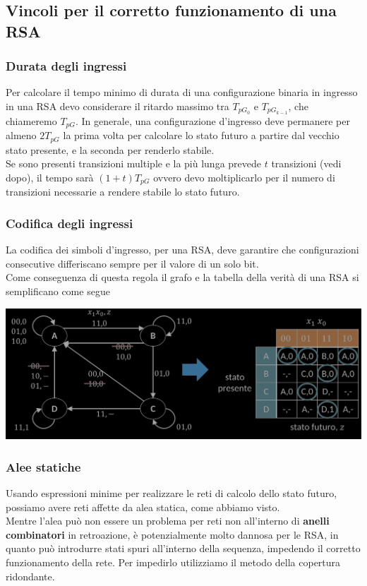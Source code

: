 \documentclass{article}
\begin{document}
\subsection{Vincoli per il corretto funzionamento di una RSA}
\subsubsection{Durata degli ingressi}
Per calcolare il tempo minimo di durata di una configurazione binaria in ingresso in una RSA devo considerare il ritardo massimo tra $T_{pG_0}$ e $T_{pG_{k-1}}$, che chiameremo $T_{pG}$. In generale, una configurazione d’ingresso deve permanere per almeno $2T_{pG}$ la prima volta per calcolare lo stato futuro a partire dal vecchio stato presente, e la seconda per renderlo stabile.\\
Se sono presenti transizioni multiple e la più lunga prevede $t$ transizioni (vedi dopo), il tempo sarà $(1+t)T_{pG}$ ovvero devo moltiplicarlo per il numero di transizioni necessarie a rendere stabile lo stato futuro.
\subsubsection{Codifica degli ingressi}
La codifica dei simboli d’ingresso, per una RSA, deve garantire che configurazioni consecutive differiscano sempre per il valore di un solo bit.
\vspace{0.2cm}\\
Come conseguenza di questa regola il grafo e la tabella della verità di una RSA si semplificano come segue
\begin{center}
    \includegraphics[scale=0.33]{cassaforteSempl.png}
\end{center}
\subsubsection{Alee statiche}
Usando espressioni minime per realizzare le reti di calcolo dello stato futuro, possiamo avere reti affette da alea statica, come abbiamo visto.\\
Mentre l’alea può non essere un problema per reti non all’interno di \textbf{anelli combinatori} in retroazione, è potenzialmente molto dannosa per le RSA, in quanto può introdurre stati spuri all’interno della sequenza, impedendo il corretto funzionamento della rete. Per impedirlo utilizziamo il metodo della copertura ridondante.
\vspace{0.1cm}\\
\noindent{}
\end{document}
